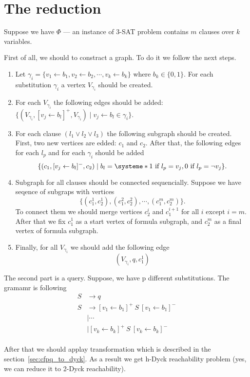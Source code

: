 \section{The reduction}

Suppose we have $\Phi$ --- an instance of 3-SAT problem contains $m$ clauses over $k$ variables.

First of all, we should to constract a graph. 
To do it we follow the next steps.
\begin{enumerate}
	\item 
	Let $\gamma_i = \{v_1 \leftarrow b_1, v_2 \leftarrow b_2, \cdots, v_k \leftarrow b_k\}$ where $b_k \in \{0,1\}$.
	For each substitution $\gamma_i$ a vertex $V_{\gamma_i}$ should be created.
	\item For each $V_{\gamma_i}$ the following edges should be added: $\{ (V_{\gamma_i}, [v_j \leftarrow b_l]^+ ,V_{\gamma_i}) \mid v_j \leftarrow b_l \in \gamma_i \}$.
	\item For each clause $(l_1 \vee l_2 \vee l_3)$ the following subgraph should be created.
	First, two new vertices are edded: $c_1$ and $c_2$.
	After that, the following edges for each $l_p$ and for each $\gamma_i$ should be added $$\{(c_1, [v_j \leftarrow b_l]^- ,c_2) \mid b_l = \systeme*{1 \text{ if } l_p = v_j, 0  \text{ if } l_p = \neg v_j} \}.$$
	\item Subgraph for all clauses should be connected sequencially. 
	Suppose we have seqence of subgraps with vertices $$\{(c_1^1,c_2^1),(c_1^2,c_2^2),\cdots,(c_1^m,c_2^m)\}.$$ To connect them we should merge vertices $c_2^{i}$ and $c_1^{i+1}$ for all $i$ except $i=m$.
	After that we fix $c_1^1$ as a start vertex of formula subgraph, and $c_2^m$ as a final vertex of formula subgraph.
    \item Finally, for all $V_{\gamma_i}$ we should add the following edge
    $$
    (V_{\gamma_i}, q ,c_1^1)
    $$
\end{enumerate}

The second part is a query.
Suppose, we have p different substitutions.
The gramamr is following
\begin{align*}
S & \to q \\
S & \to [v_1 \leftarrow b_1]^+ \ S \ [v_1 \leftarrow b_1]^-  \\
  & \mid \cdots \\
  & \mid  [v_k \leftarrow b_k]^+ \ S \ [v_k \leftarrow b_k]^- \\ 
\end{align*}

After that we should applay transformation which is described in the section~\ref{sec:cfpq_to_dyck}. 
As a result we get h-Dyck reachability problem (yes, we can reduce it to 2-Dyck reachability).

